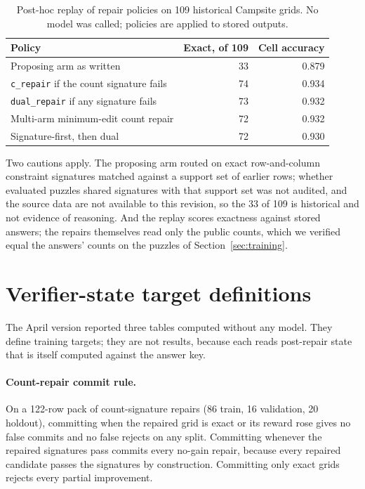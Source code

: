 \documentclass[11pt]{article}
\begin{document}
\begin{table}[t]
  \centering
  \small
  \begin{tabular}{lrr}
    \toprule
    Policy & Exact, of 109 & Cell accuracy \\
    \midrule
    Proposing arm as written & 33 & 0.879 \\
    \texttt{c\_repair} if the count signature fails & 74 & 0.934 \\
    \texttt{dual\_repair} if any signature fails & 73 & 0.932 \\
    Multi-arm minimum-edit count repair & 72 & 0.932 \\
    Signature-first, then dual & 72 & 0.930 \\
    \bottomrule
  \end{tabular}
  \caption{Post-hoc replay of repair policies on 109 historical Campsite grids. No model was called; policies are applied to stored outputs.}
  \label{tab:flow}
\end{table}

Two cautions apply. The proposing arm routed on exact row-and-column constraint signatures matched against a support set of earlier rows; whether evaluated puzzles shared signatures with that support set was not audited, and the source data are not available to this revision, so the 33 of 109 is historical and not evidence of reasoning. And the replay scores exactness against stored answers; the repairs themselves read only the public counts, which we verified equal the answers' counts on the puzzles of Section~\ref{sec:training}.

\section{Verifier-state target definitions}
\label{sec:targets}

The April version reported three tables computed without any model. They define training targets; they are not results, because each reads post-repair state that is itself computed against the answer key.

\paragraph{Count-repair commit rule.} On a 122-row pack of count-signature repairs (86 train, 16 validation, 20 holdout), committing when the repaired grid is exact or its reward rose gives no false commits and no false rejects on any split. Committing whenever the repaired signatures pass commits every no-gain repair, because every repaired candidate passes the signatures by construction. Committing only exact grids rejects every partial improvement.
\end{document}
